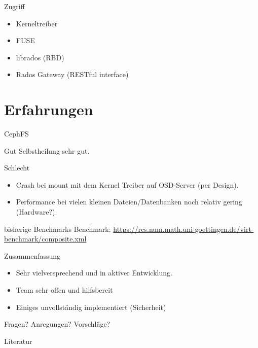 \documentclass[hyperref={xetex}]{beamer}
\begin{document}
\begin{frame}{Zugriff}
	\begin{itemize}
		\item Kerneltreiber
		\item FUSE
		\item librados (RBD)
		\item Rados Gateway (RESTful interface)
	\end{itemize}
\end{frame}

\section{Erfahrungen}

\begin{frame}{CephFS}
    \begin{block}{Gut}
        Selbstheilung sehr gut.
    \end{block}
    \begin{block}{Schlecht}
    \begin{itemize}
        \item Crash bei mount mit dem Kernel Treiber auf OSD-Server (per Design).
        \item Performance bei vielen kleinen Dateien/Datenbanken noch relativ gering (Hardware?).
    \end{itemize}
\end{block}
\end{frame}

\begin{frame}{bisherige Benchmarks}
Benchmark: \url{https://rcs.num.math.uni-goettingen.de/virt-benchmark/composite.xml}

\end{frame}
\begin{frame}{Zusammenfassung}
\begin{itemize}
	\item Sehr vielversprechend und in aktiver Entwicklung.
\item Team sehr offen und hilfsbereit
	\item Einiges unvollst\"andig implementiert (Sicherheit)
\end{itemize}
	\begin{center}
	\large Fragen? Anregungen? Vorschl\"age? 
	\end{center}
\end{frame}

	

\begin{frame}{Literatur}
	
		
\end{frame}
\end{document}
